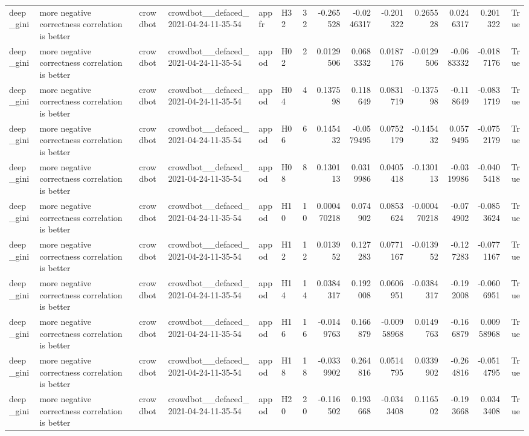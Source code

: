 \begin{longtable}{llllllrrrrrrrr}
deep\_gini & more negative correctness correlation is better & crowdbot & crowdbot\_\_defaced\_2021-04-24-11-35-54 & appfr & H32 & 32 & -0.265528 & -0.0246317 & -0.201322 & 0.265528 & 0.0246317 & 0.201322 & True \\
deep\_gini & more negative correctness correlation is better & crowdbot & crowdbot\_\_defaced\_2021-04-24-11-35-54 & appod & H02 & 2 & 0.0129506 & 0.0683332 & 0.0187176 & -0.0129506 & -0.0683332 & -0.0187176 & True \\
deep\_gini & more negative correctness correlation is better & crowdbot & crowdbot\_\_defaced\_2021-04-24-11-35-54 & appod & H04 & 4 & 0.137598 & 0.118649 & 0.0831719 & -0.137598 & -0.118649 & -0.0831719 & True \\
deep\_gini & more negative correctness correlation is better & crowdbot & crowdbot\_\_defaced\_2021-04-24-11-35-54 & appod & H06 & 6 & 0.145432 & -0.0579495 & 0.0752179 & -0.145432 & 0.0579495 & -0.0752179 & True \\
deep\_gini & more negative correctness correlation is better & crowdbot & crowdbot\_\_defaced\_2021-04-24-11-35-54 & appod & H08 & 8 & 0.130113 & 0.0319986 & 0.0405418 & -0.130113 & -0.0319986 & -0.0405418 & True \\
deep\_gini & more negative correctness correlation is better & crowdbot & crowdbot\_\_defaced\_2021-04-24-11-35-54 & appod & H10 & 10 & 0.000470218 & 0.074902 & 0.0853624 & -0.000470218 & -0.074902 & -0.0853624 & True \\
deep\_gini & more negative correctness correlation is better & crowdbot & crowdbot\_\_defaced\_2021-04-24-11-35-54 & appod & H12 & 12 & 0.013952 & 0.127283 & 0.0771167 & -0.013952 & -0.127283 & -0.0771167 & True \\
deep\_gini & more negative correctness correlation is better & crowdbot & crowdbot\_\_defaced\_2021-04-24-11-35-54 & appod & H14 & 14 & 0.0384317 & 0.192008 & 0.0606951 & -0.0384317 & -0.192008 & -0.0606951 & True \\
deep\_gini & more negative correctness correlation is better & crowdbot & crowdbot\_\_defaced\_2021-04-24-11-35-54 & appod & H16 & 16 & -0.0149763 & 0.166879 & -0.00958968 & 0.0149763 & -0.166879 & 0.00958968 & True \\
deep\_gini & more negative correctness correlation is better & crowdbot & crowdbot\_\_defaced\_2021-04-24-11-35-54 & appod & H18 & 18 & -0.0339902 & 0.264816 & 0.0514795 & 0.0339902 & -0.264816 & -0.0514795 & True \\
deep\_gini & more negative correctness correlation is better & crowdbot & crowdbot\_\_defaced\_2021-04-24-11-35-54 & appod & H20 & 20 & -0.116502 & 0.193668 & -0.0343408 & 0.116502 & -0.193668 & 0.0343408 & True \\

\end{longtable}
